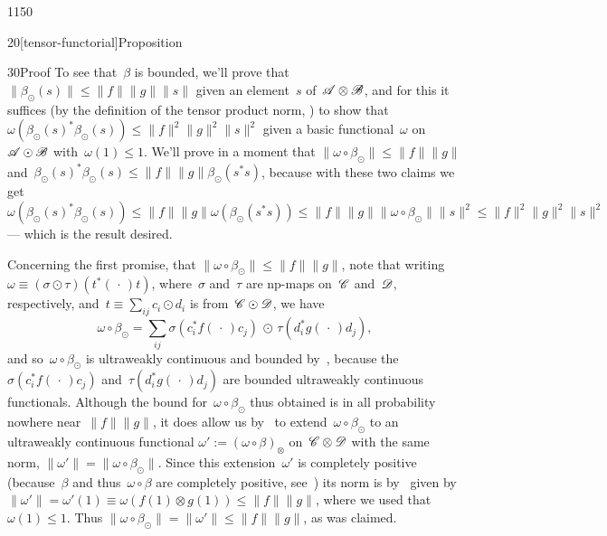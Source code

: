 \begin{parsec}{1150}
\begin{point}{20}[tensor-functorial]{Proposition}
\begin{point}{30}{Proof}
To see that~$\beta$ is bounded,
we'll prove that~$\|\beta_\odot(s)\| \leq \|f\|\|g\| \|s\|$
given an element~$s$ of~$\mathscr{A}\otimes \mathscr{B}$,
and for this
it suffices (by the definition
of the tensor product norm, ) 
to show that
$\omega(\beta_\odot(s)^*\beta_\odot(s))
\leq \|f\|^2\|g\|^2\|s\|^2$
given a basic functional~$\omega$
on~$\mathscr{A}\odot\mathscr{B}$ with~$\omega(1)\leq 1$.
We'll prove in a moment that
$\|\omega\circ\beta_\odot\|\leq \|f\|\|g\|$
and~$\beta_\odot(s)^*\beta_\odot(s)\leq
\|f\|\|g\|\beta_\odot(s^*s)$,
because with these two claims
we get 
$\omega(\beta_\odot(s)^*\beta_\odot(s))
\leq \|f\|\|g\|\omega(\beta_\odot(s^*s))
\leq \|f\|\|g\| \|\omega\circ \beta_\odot\| \|s\|^2
\leq \|f\|^2\|g\|^2\|s\|^2$
 --- which is the result desired.

Concerning the first
promise, that $\|\omega\circ \beta_\odot\|\leq \|f\|\|g\|$,
note that writing
$\omega\equiv (\sigma\odot\tau)(t^*(\,\cdot\,)t)$,
where~$\sigma$ and~$\tau$
are np-maps on~$\mathscr{C}$ and~$\mathscr{D}$, respectively,
and~$t\equiv\sum_{ij} c_i \odot d_i$
is from~$\mathscr{C}\odot\mathscr{D}$,
we have 
\begin{equation*}
	\omega\circ\beta_\odot
= \textstyle \sum_{ij} \sigma(c_i^* f(\,\cdot\,)c_j)\,\odot\,
\tau(d_i^* g(\,\cdot\,)d_j),
\end{equation*}
and so~$\omega\circ \beta_\odot$
is ultraweakly continuous and bounded
by~,
because the $\sigma(c_i^*f(\,\cdot\,)c_j)$
and~$\tau(d_i^*g(\,\cdot\,)d_j)$
are bounded ultraweakly continuous functionals.
Although the bound for~$\omega\circ\beta_\odot$ 
thus obtained is in all probability nowhere near~$\|f\|\|g\|$,
it does allow
us by~
to extend~$\omega\circ\beta_\odot$
to an ultraweakly continuous 
functional $\omega':=(\omega\circ\beta)_\otimes$ on~$\mathscr{C}\otimes \mathscr{D}$
with the same norm, $\|\omega'\|=\|\omega\circ\beta_\odot\|$.
Since this extension~$\omega'$
is completely positive
(because~$\beta$ and thus~$\omega\circ \beta$ are completely positive,
see~)
its norm is by~ given by~$\|\omega'\|=\omega'(1)\equiv
\omega(f(1)\otimes g(1))\leq \|f\|\|g\|$,
where we used that~$\omega(1)\leq 1$.
Thus $\|\omega\circ \beta_\odot\|=\|\omega'\| \leq \|f\|\|g\|$,
as was claimed.


\end{point}
\end{point}
\end{parsec}

